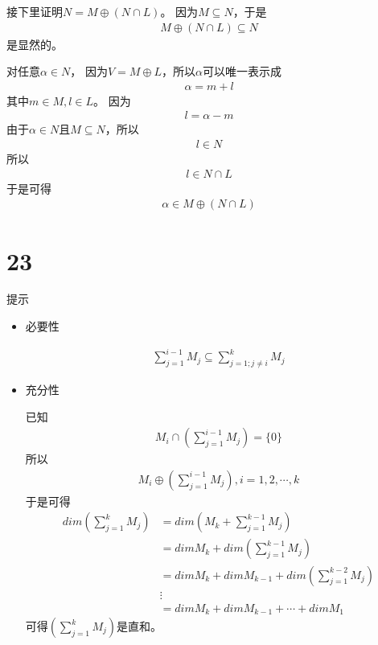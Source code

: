 \documentclass{article}
\begin{document}
接下里证明$N = M \oplus (N \cap L)$。
因为$M \subseteq N$，于是
\begin{align*}
  M \oplus (N \cap L) \subseteq N
\end{align*}
是显然的。

对任意$\alpha \in N$，
因为$V = M \oplus L$，所以$\alpha$可以唯一表示成
\begin{align*}
  \alpha = m + l
\end{align*}
其中$m \in M, l \in L$。
因为
\begin{align*}
  l = \alpha - m
\end{align*}
由于$\alpha \in N$且$M \subseteq N$，所以
\begin{align*}
  l \in N
\end{align*}
所以
\begin{align*}
  l \in N \cap L
\end{align*}
于是可得
\begin{align*}
  \alpha \in M \oplus (N \cap L)
\end{align*}

\section*{23}

提示
\begin{itemize}
  \item 必要性

        \begin{align*}
          \sum\limits_{j = 1}^{i - 1} M_j \subseteq \sum\limits_{j = 1; j \neq i}^{k} M_j
        \end{align*}

  \item 充分性

        已知
        \begin{align*}
          M_i \cap \left(\sum\limits_{j = 1}^{i - 1} M_j\right) = \{0\}
        \end{align*}
        所以
        \begin{align*}
          M_i \oplus \left(\sum\limits_{j = 1}^{i - 1} M_j\right), i = 1, 2, \cdots, k
        \end{align*}
        于是可得
        \begin{align*}
          dim \left(\sum\limits_{j = 1}^{k} M_j\right)
          & = dim \left(M_k + \sum\limits_{j = 1}^{k-1} M_j\right) \\
          & = dim M_k + dim \left(\sum\limits_{j = 1}^{k-1} M_j\right) \\
          & = dim M_k + dim M_{k-1} + dim \left(\sum\limits_{j = 1}^{k-2} M_j\right) \\
          & \vdots \\
          & = dim M_k + dim M_{k-1} + \cdots + dim M_1
        \end{align*}
        可得$\left(\sum\limits_{j = 1}^{k} M_j\right)$是直和。
\end{itemize}
\end{document}
